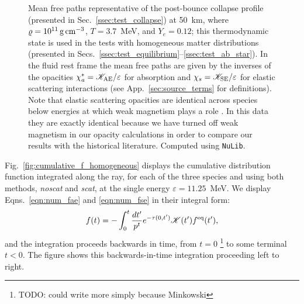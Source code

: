 \documentclass[aps,floatfix,prd,superscriptaddress,twocolumn]{revtex4-1}
\begin{document}
\begin{figure}
  \resizebox{\columnwidth}{!}{}
  \caption{Mean free paths
    representative of the post-bounce collapse profile (presented in
    Sec.~\ref{ssec:test_collapse}) at
    50~km, where $\varrho=10^{11}\,{\rm g}\,{\rm cm}^{-3}$,
    $T=3.7$~MeV, and $Y_e=0.12$; this thermodynamic state is used in
    the tests with homogeneous matter distributions
    (presented in Secs.~\ref{ssec:test_equilibrium}--\ref{ssec:test_ab_star}).
    In the fluid rest frame the mean free paths are given by the inverses of the opacities
    $\chi^*_a=\mathscr{K}_{\rm AE}/\varepsilon$ for absorption and
    $\chi_s=\mathscr{K}_{\rm SE}/\varepsilon$ for elastic scattering interactions
    (see App.~\ref{sec:source_terms} for definitions).
    Note that elastic scattering opacities are identical across species
    below energies at which weak magnetism plays a role \cite{horo2002-weak_mag}.
    In this data they are exactly identical
    because we have turned off weak magnetism in our opacity calculations
    in order to compare our results with the historical literature.
    Computed using \lstinline{NuLib}.
  }
  \label{fig:mfps-50km}
\end{figure}

Fig.~\ref{fig:cumulative_f_homogeneous} displays the cumulative distribution
function integrated along the ray, for each of the three species and using
both methods, \emph{noscat} and \emph{scat}, at the single energy
$\varepsilon=11.25$~MeV. We display
Eqns.~\ref{eqn:num_fae} and \ref{eqn:num_fse} in their integral form:
\begin{equation}
  \label{eqn:cumulative_f}
  f(t)
  = - \int_{0}^t \frac{dt'}{p^t}e^{-\tau(0,t')}
  \mathscr{K}(t')f^{\rm eq}(t'),
\end{equation}
and the integration proceeds backwards in time, from $t=0$
\footnote{TODO: could write more simply because Minkowski}
to some terminal $t<0$.
The figure shows this backwards-in-time integration proceeding left to right.
\end{document}
